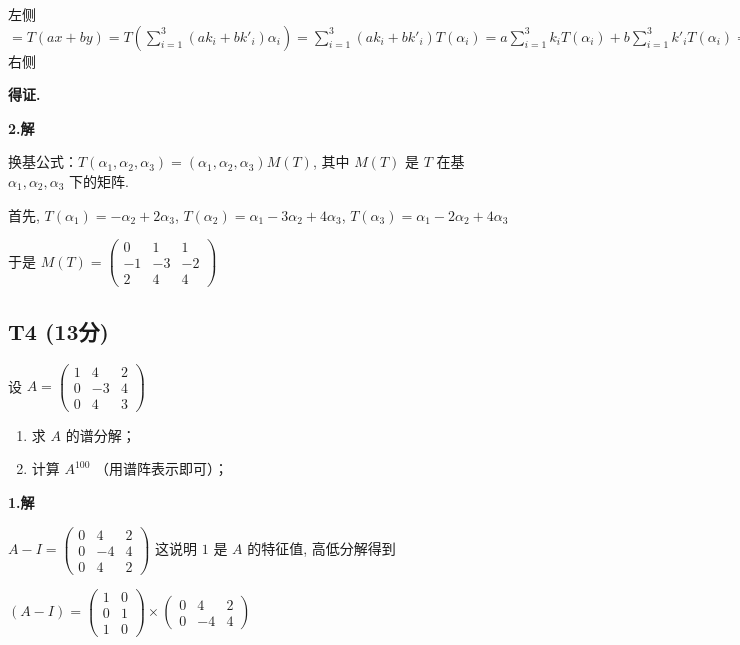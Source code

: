 \documentclass{article}
\begin{document}
左侧 $=T(ax+by)=T(\sum_{i=1}^3(ak_i + bk'_i)\alpha_i)=\sum_{i=1}^3(ak_i + bk'_i)T(\alpha_i)=a\sum_{i=1}^3k_iT(\alpha_i)+b\sum_{i=1}^3 k'_iT(\alpha_i)=$ 右侧

\textbf{得证.}

\par \textbf{2.解}

换基公式：$T(\alpha_1, \alpha_2, \alpha_3)=(\alpha_1, \alpha_2, \alpha_3) M(T)$, 其中 $M(T)$ 是 $T$ 在基 $\alpha_1, \alpha_2, \alpha_3$ 下的矩阵.

首先, $T(\alpha_1)=-\alpha_2+2\alpha_3$, $T(\alpha_2)=\alpha_1-3\alpha_2+4\alpha_3$,  $T(\alpha_3)=\alpha_1-2\alpha_2+4\alpha_3$

于是 $M(T)=\begin{pmatrix}
	0 & 1 & 1\\
	-1 & -3 & -2\\
	2 & 4 & 4
\end{pmatrix}$

\subsection{T4 (13分)}

\par 设 $A=\begin{pmatrix}
	1 & 4 & 2\\
	0 & -3 & 4\\
	0 & 4 & 3
\end{pmatrix}$

\begin{enumerate}
	\item 求 $A$ 的谱分解；
	\item 计算 $A^{100}$ （用谱阵表示即可）；
\end{enumerate}

\par \textbf{1.解}

$A-I=\begin{pmatrix}
	0 & 4 & 2\\
	0 & -4 & 4\\
	0 & 4 & 2
\end{pmatrix}$ 这说明 $1$ 是 $A$ 的特征值, 高低分解得到

$(A-I)=\begin{pmatrix}
	1 & 0\\
	0 & 1\\
	1 & 0
\end{pmatrix} \times \begin{pmatrix}
	0 & 4 & 2\\
	0 & -4 & 4
\end{pmatrix}$
\end{document}
